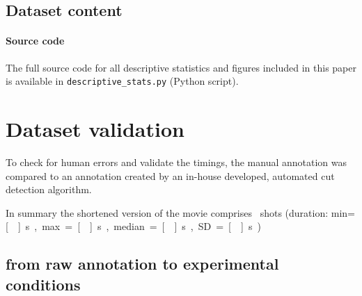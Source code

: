 \documentclass[10pt,a4paper,twocolumn]{article}
\begin{document}
\subsection*{Dataset content}


\paragraph{Source code}

The full source code for all descriptive statistics and figures included in
this paper is available in \texttt{descriptive\_stats.py} (Python script).


\section*{Dataset validation}

To check for human errors and validate the timings, the manual annotation was
compared to an annotation created by an in-house developed, automated cut
detection algorithm.

In summary the shortened version of the movie comprises
\NShots\ shots (duration: min=\unit[\ShotLengthMin]{s},
max=\unit[\ShotLengthMax]{s}, median=\unit[\ShotLengthMedian]{s},
SD=\unit[\ShotLengthSD]{s}).




\subsection*{from raw annotation to experimental conditions}

\end{document}

